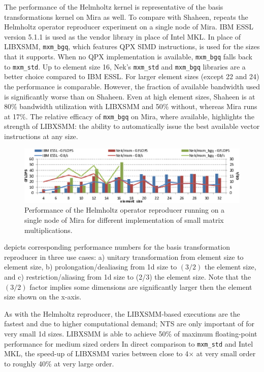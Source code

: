 The performance of the Helmholtz kernel is representative of the basis transformations kernel on Mira as well.
To compare with Shaheen,  repeats the Helmholtz operator reproducer experiment
on a single node of Mira. 
IBM ESSL version 5.1.1 is used as the vendor library in place of Intel MKL.
In place of LIBXSMM, \texttt{mxm\_bgq}, which features QPX SIMD instructions, is used for the sizes that it supports.
When no QPX implementation is available, \texttt{mxm\_bgq} falls back to \texttt{mxm\_std}. 
Up to element size 16, Nek's \texttt{mxm\_std} and \texttt{mxm\_bgq} libraries are a better choice compared to IBM ESSL.
For larger element sizes (except 22 and 24) the performance is comparable.
However, the fraction of available bandwidth used is significantly worse than on Shaheen. 
Even at high element sizes, Shaheen is at 80\% bandwidth utilization with LIBXSMM and 50\% without, whereas Mira runs at 17\%.
The relative efficacy of \texttt{mxm\_bgq} on Mira, where available, highlights the strength of LIBXSMM: the ability to automatically issue the best available vector instructions at any size.


\begin{figure}[!t]
\centering
\includegraphics[width=1.0\textwidth]{gfx/axhm_mira}
\caption{
Performance of the Helmholtz operator reproducer running on a single node of Mira for different implementation of small matrix multiplications.}
\label{fig:axhm_mira}
\end{figure}

 depicts corresponding performance numbers for the basis transformation reproducer in three use cases: a) unitary transformation from element size to element size, b) prolongation/dealiasing from 1d size to $(3/2)$ the element size, and c) restriction/aliasing from 1d size to (2/3) the element size.
Note that the $(3/2)$ factor implies some dimensions are significantly larger then the element size shown on the x-axis.

As with the Helmholtz reproducer, the LIBXSMM-based executions are the fastest and due to higher
computational demand; 
NTS are only important of for very small 1d sizes. 
LIBXSMM is able to achieve 50\% of maximum floating-point performance for medium sized orders
In direct comparison to \texttt{mxm\_std} and Intel MKL, the speed-up of LIBXSMM varies between close to 4$\times$ at very small order to roughly 40\% at very large order.

